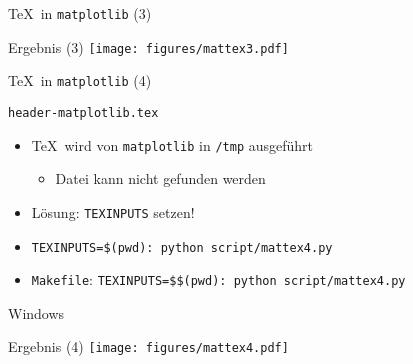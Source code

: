 \begin{frame}[fragile]{\TeX\ in \texttt{matplotlib} (3)}
\end{frame}

\AddToShipoutPictureFG*{\ShowFramePicture}
\begin{frame}{Ergebnis (3)}
  \centering
  \texttt{[image: figures/mattex3.pdf]}
\end{frame}

\begin{frame}[fragile]{\TeX\ in \texttt{matplotlib} (4)}
\end{frame}

\begin{frame}[fragile]{\texttt{header-matplotlib.tex}}
  

  \vspace*{-0.5em}
  \begin{itemize}
    \item \TeX\ wird von \texttt{matplotlib} in \texttt{/tmp} ausgeführt
      \begin{itemize}
        \item Datei kann nicht gefunden werden
      \end{itemize}
    \item Lösung: \texttt{TEXINPUTS} setzen!
    \item \texttt{TEXINPUTS=\$(pwd): python script/mattex4.py}
    \item \texttt{Makefile}: \texttt{TEXINPUTS=\$\$(pwd): python script/mattex4.py}
  \end{itemize}
  \vspace*{-1em}
\end{frame}

\begin{frame}[fragile]{Windows}
\end{frame}

\AddToShipoutPictureFG*{\ShowFramePicture}
\begin{frame}{Ergebnis (4)}
  \centering
  \texttt{[image: figures/mattex4.pdf]}
\end{frame}

